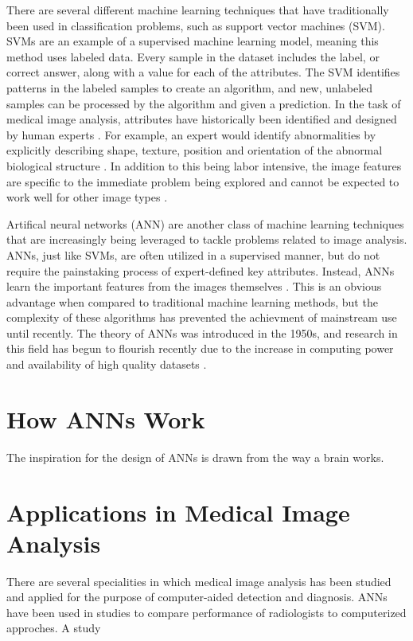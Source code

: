 \documentclass[sigconf]{acmart}
\begin{document}
There are several different machine learning techniques that have traditionally been used in classification problems, such as support vector machines (SVM). SVMs are an example of a supervised machine learning model, meaning this method uses labeled data. Every sample in the dataset includes the label, or correct answer, along with a value for each of the attributes. The SVM identifies patterns in the labeled samples to create an algorithm, and new, unlabeled samples can be processed by the algorithm and given a prediction. In the task of medical image analysis, attributes have historically been identified and designed by human experts \cite{cite06}. For example, an expert would identify abnormalities by explicitly describing shape, texture, position and orientation of the abnormal biological structure \cite{cite07}.  In addition to this being labor intensive, the image features are specific to the immediate problem being explored and cannot be expected to work well for other image types \cite{cite06}.

Artifical neural networks (ANN) are another class of machine learning techniques that are increasingly being leveraged to tackle problems related to image analysis. ANNs, just like SVMs, are often utilized in a supervised manner, but do not require the painstaking process of expert-defined key attributes. Instead, ANNs learn the important features from the images themselves \cite{cite07}. This is an obvious advantage when compared to traditional machine learning methods, but the complexity of these algorithms has prevented the achievment of mainstream use until recently. The theory of ANNs was introduced in the 1950s, and research in this field has begun to flourish recently due to the increase in computing power and availability of high quality datasets \cite{cite05}.

\section{How ANNs Work}

The inspiration for the design of ANNs is drawn from the way a brain works. 

\section{Applications in Medical Image Analysis}

There are several specialities in which medical image analysis has been studied and applied for the purpose of computer-aided detection and diagnosis. ANNs have been used in studies to compare performance of radiologists to computerized approches. A study 
\end{document}
